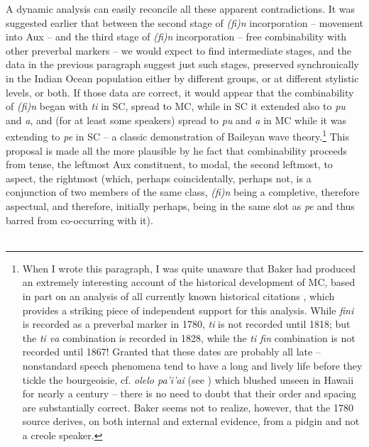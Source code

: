A dynamic analysis can easily reconcile all these apparent contradictions. It was suggested earlier that between the second stage of \textit{(fi)n} incorporation -- movement into Aux -- and the third stage of \textit{(fi)n} incorporation -- free combinability with other preverbal markers -- we would expect to find intermediate stages, and the data in the previous paragraph suggest just such stages, preserved synchronically in the Indian Ocean population either by different groups, or at different stylistic levels, or both. If those data are correct, it would appear that the combinability of \textit{(fi)n} began with \textit{ti} in SC, spread to MC, while in SC it extended also to \textit{pu} and \textit{a}, and (for at least some speakers) spread to \textit{pu} and \textit{a} in MC while it was extending to \textit{pe} in SC -- a classic demonstration of Baileyan wave theory.\footnote{When I wrote this paragraph, I was quite unaware that Baker had produced an extremely interesting account of the historical de\-velopment of MC, based in part on an analysis of all currently known historical citations \citep{Baker1976}, which provides a striking piece of independent support for this analysis. While \textit{fini} is recorded as a pre\-verbal marker in 1780, \textit{ti} is not recorded until 1818; but the \textit{ti va} combination is recorded in 1828, while the \textit{ti fin} combination is not recorded until 1867! Granted that these dates are probably all late -- nonstandard speech phenomena tend to have a long and lively life before they tickle the bourgeoisie, cf. \textit{olelo pa'i'ai} (see ) which blushed unseen in Hawaii for nearly a century -- there is no need to doubt that their order and spacing are substantially correct. Baker seems not to realize, however, that the 1780 source derives, on both internal and external evidence, from a pidgin and not a creole speaker.} This proposal is made all the more plausible by he fact that combinability proceeds from tense, the leftmost Aux constituent, to modal, the second leftmost, to aspect, the rightmost (which, perhaps coincidentally, perhaps
not, is a conjunction of two members of the same class, \textit{(fi)n} being a completive, therefore aspectual, and therefore, initially perhaps, being in the same slot as \textit{pe} and thus barred from co-occurring with it).\\\\

